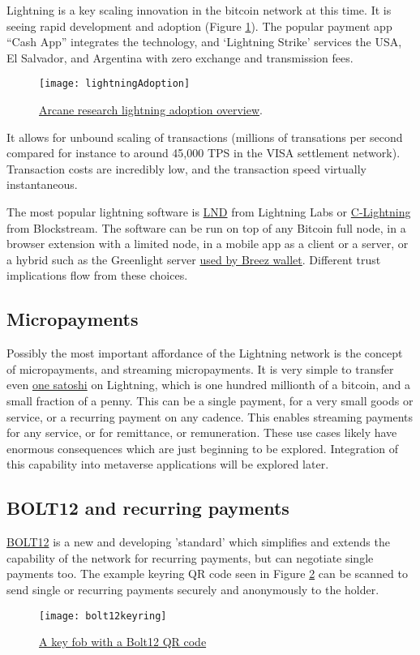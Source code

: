 Lightning is a key scaling innovation in the bitcoin network at this time. It is seeing rapid development and adoption (Figure \ref{fig:lightningAdoption}). The popular payment app ``Cash App'' integrates the technology, and `Lightning Strike' services the USA, El Salvador, and Argentina with zero exchange and transmission fees.
\begin{figure}
  \centering
    \texttt{[image: lightningAdoption]}
  \caption{\href{https://www.research.arcane.no/the-state-of-lightning}{Arcane research lightning adoption overview}.}
  \label{fig:lightningAdoption}
\end{figure}
It allows for unbound scaling of transactions (millions of transations per second compared for instance to around 45,000 TPS in the VISA settlement network). Transaction costs are incredibly low, and the transaction speed virtually instantaneous.\par
The most popular lightning software is \href{https://github.com/lightningnetwork/lnd#readme}{LND} from Lightning Labs or \href{https://github.com/ElementsProject/lightning}{C-Lightning} from Blockstream. The software can be run on top of any Bitcoin full node, in a browser extension with a limited node, in a mobile app as a client or a server, or a hybrid such as the Greenlight server \href{https://medium.com/breez-technology/get-ready-for-a-fresh-breez-multiple-apps-one-node-optimal-ux-519c4daf2536}{used by Breez wallet}. Different trust implications flow from these choices.
\subsection{Micropayments}
Possibly the most important affordance of the Lightning network is the concept of micropayments, and streaming micropayments. It is very simple to transfer even \href{https://satsymbol.com/}{one satoshi} on Lightning, which is one hundred millionth of a bitcoin, and a small fraction of a penny. This can be a single payment, for a very small goods or service, or a recurring payment on any cadence. This enables streaming payments for any service, or for remittance, or remuneration. These use cases likely have enormous consequences which are just beginning to be explored. Integration of this capability into metaverse applications will be explored later.
\subsection{BOLT12 and recurring payments}
\href{https://bolt12.org/}{BOLT12} is a new and developing 'standard' which simplifies and extends the capability of the network for recurring payments, but can negotiate single payments too. The example keyring QR code seen in Figure \ref{fig:bolt12keyring} can be scanned to send single or recurring payments securely and anonymously to the holder.
\begin{figure}
  \centering
    \texttt{[image: bolt12keyring]}
  \caption{\href{https://twitter.com/SeedMint21/status/1518934554840600579}{A key fob with a Bolt12 QR code}}
  \label{fig:bolt12keyring}
\end{figure}
